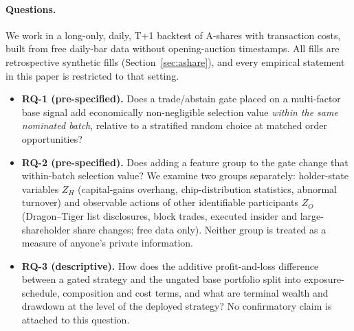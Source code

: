 \documentclass[11pt]{article}
\theoremstyle{remark}
\newcommand{\ZH}{Z_H}
\newcommand{\ZO}{Z_O}
\begin{document}
\paragraph{Questions.}
We work in a long-only, daily, T+1 backtest of A-shares with transaction costs, built from free
daily-bar data without opening-auction timestamps. All fills are retrospective synthetic fills
(Section~\ref{sec:ashare}), and every empirical statement in this paper is restricted to that
setting.
\begin{itemize}
\item \textbf{RQ-1 (pre-specified).} Does a trade/abstain gate placed on a multi-factor base
signal add economically non-negligible selection value \emph{within the same nominated batch},
relative to a stratified random choice at matched order opportunities?
\item \textbf{RQ-2 (pre-specified).} Does adding a feature group to the gate change that
within-batch selection value? We examine two groups separately: holder-state variables $\ZH$
(capital-gains overhang, chip-distribution statistics, abnormal turnover) and observable actions
of other identifiable participants $\ZO$ (Dragon--Tiger list disclosures, block trades, executed
insider and large-shareholder share changes; free data only). Neither group is treated as a
measure of anyone's private information.
\item \textbf{RQ-3 (descriptive).} How does the additive profit-and-loss difference between a
gated strategy and the ungated base portfolio split into exposure-schedule, composition and cost
terms, and what are terminal wealth and drawdown at the level of the deployed strategy? No
confirmatory claim is attached to this question.
\end{itemize}
\end{document}
